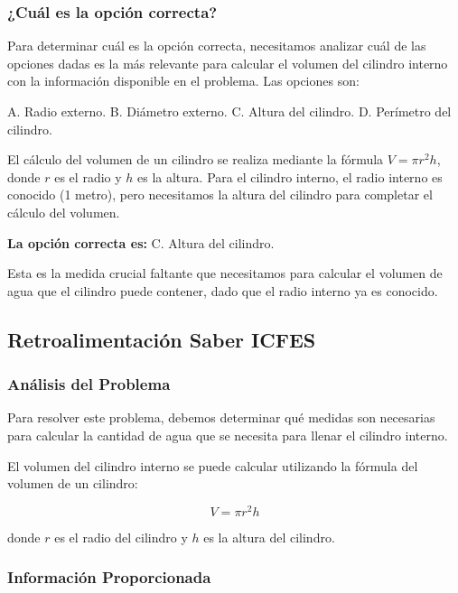 \documentclass[
]{article}
\begin{document}
\subsubsection{\texorpdfstring{\textbf{¿Cuál es la opción
correcta?}}{¿Cuál es la opción correcta?}}\label{cuuxe1l-es-la-opciuxf3n-correcta}

Para determinar cuál es la opción correcta, necesitamos analizar cuál de
las opciones dadas es la más relevante para calcular el volumen del
cilindro interno con la información disponible en el problema. Las
opciones son:

A. Radio externo. B. Diámetro externo. C. Altura del cilindro. D.
Perímetro del cilindro.

El cálculo del volumen de un cilindro se realiza mediante la fórmula
\(V = \pi r^2 h\), donde \(r\) es el radio y \(h\) es la altura. Para el
cilindro interno, el radio interno es conocido (1 metro), pero
necesitamos la altura del cilindro para completar el cálculo del
volumen.

\textbf{La opción correcta es:} C. Altura del cilindro.

Esta es la medida crucial faltante que necesitamos para calcular el
volumen de agua que el cilindro puede contener, dado que el radio
interno ya es conocido.

\subsection{\texorpdfstring{\textbf{Retroalimentación Saber
ICFES}}{Retroalimentación Saber ICFES}}\label{retroalimentaciuxf3n-saber-icfes}

\subsubsection{Análisis del Problema}\label{anuxe1lisis-del-problema}

Para resolver este problema, debemos determinar qué medidas son
necesarias para calcular la cantidad de agua que se necesita para llenar
el cilindro interno.

El volumen del cilindro interno se puede calcular utilizando la fórmula
del volumen de un cilindro:

\[ V = \pi r^2 h \]

donde \(r\) es el radio del cilindro y \(h\) es la altura del cilindro.

\subsubsection{Información
Proporcionada}\label{informaciuxf3n-proporcionada}
\end{document}
